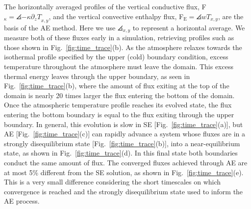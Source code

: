 The horizontally averaged profiles of the vertical conductive flux, F$_{\kappa} = \angles{-\kappa\partial_z T}_{x,y}$, and the vertical convective enthalpy flux, F$_{\text{E}} = \angles{wT}_{x,y}$, are the basis of the AE method.
Here we use $\angles{}_{x,y}$ to represent a horizontal average. 
We measure both of these fluxes early in a simulation, retrieving profiles such as those shown in Fig.~\ref{fig:time_trace}(b).
As the atmosphere relaxes towards the isothermal profile specified by the upper (cold) boundary condition, excess temperature throughout the atmosphere must leave the domain. 
This excess thermal energy leaves through the upper boundary, as seen in Fig.~\ref{fig:time_trace}(b), where the amount of flux exiting at the top of the domain is nearly 20 times larger the flux entering the bottom of the domain. 
Once the atmospheric temperature profile reaches its evolved state, the flux entering the bottom boundary is equal to the flux exiting through the upper boundary.  
In general, this evolution is slow in SE [Fig.~\ref{fig:time_trace}(a)], but AE [Fig.~\ref{fig:time_trace}(c)] can rapidly advance a system whose fluxes are in a strongly disequilibrium state [Fig.~\ref{fig:time_trace}(b)], into a near-equilibrium state, as shown in Fig.~\ref{fig:time_trace}(d). 
In this final state both boundaries conduct the same amount of flux.
The converged fluxes achieved through AE are at most 5\% different from the SE solution, as shown in Fig.~\ref{fig:time_trace}(e). 
This is a very small difference considering the short timescales on which convergence is reached and the strongly disequilibrium state used to inform the AE process.

